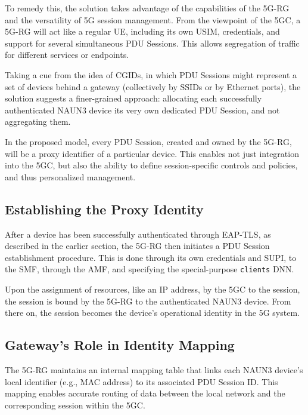 To remedy this, the solution takes advantage of the capabilities of the \ac{5G-RG} and the versatility of \ac{5G} session management. From the viewpoint of the \ac{5GC}, a \ac{5G-RG} will act like a regular \ac{UE}, including its own \ac{USIM}, credentials, and support for several simultaneous \ac{PDU} Sessions. This allows segregation of traffic for different services or endpoints.

Taking a cue from the idea of \acp{CGID}, in which \ac{PDU} Sessions might represent a set of devices behind a gateway (collectively by \acp{SSID} or by Ethernet ports), the solution suggests a finer-grained approach: allocating each successfully authenticated \ac{NAUN3} device its very own dedicated \ac{PDU} Session, and not aggregating them.

In the proposed model, every \ac{PDU} Session, created and owned by the \ac{5G-RG}, will be a proxy identifier of a particular device. This enables not just integration into the \ac{5GC}, but also the ability to define session-specific controls and policies, and thus personalized management.

\subsection{Establishing the Proxy Identity}

After a device has been successfully authenticated through \ac{EAP-TLS}, as described in the earlier section, the \ac{5G-RG} then initiates a \ac{PDU} Session establishment procedure. This is done through its own credentials and \ac{SUPI}, to the \ac{SMF}, through the \ac{AMF}, and specifying the special-purpose \texttt{clients} \ac{DNN}.

Upon the assignment of resources, like an \ac{IP} address, by the \ac{5GC} to the session, the session is bound by the \ac{5G-RG} to the authenticated \ac{NAUN3} device. From there on, the session becomes the device’s operational identity in the \ac{5G} system.

\subsection{Gateway’s Role in Identity Mapping}

The \ac{5G-RG} maintains an internal mapping table that links each \ac{NAUN3} device’s local identifier (e.g., \ac{MAC} address) to its associated \ac{PDU} Session ID. This mapping enables accurate routing of data between the local network and the corresponding session within the \ac{5GC}.

